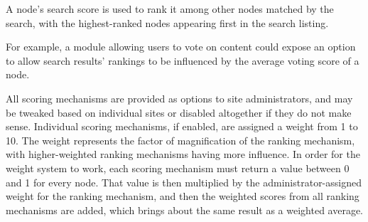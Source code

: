 A node's search score is used to rank it among other nodes matched by the search, with the highest-\/ranked nodes appearing first in the search listing.

For example, a module allowing users to vote on content could expose an option to allow search results' rankings to be influenced by the average voting score of a node.

All scoring mechanisms are provided as options to site administrators, and may be tweaked based on individual sites or disabled altogether if they do not make sense. Individual scoring mechanisms, if enabled, are assigned a weight from 1 to 10. The weight represents the factor of magnification of the ranking mechanism, with higher-\/weighted ranking mechanisms having more influence. In order for the weight system to work, each scoring mechanism must return a value between 0 and 1 for every node. That value is then multiplied by the administrator-\/assigned weight for the ranking mechanism, and then the weighted scores from all ranking mechanisms are added, which brings about the same result as a weighted average.

